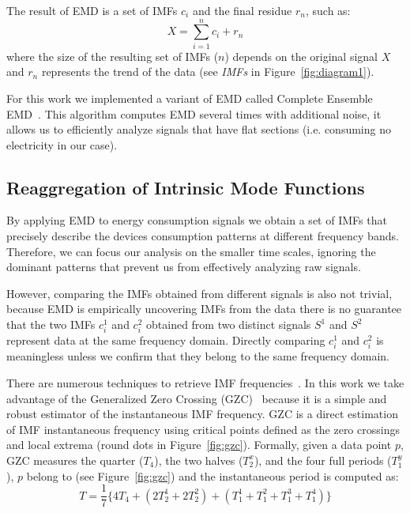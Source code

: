 The result of EMD is a set of IMFs $c_i$ and the final residue $r_n$, such as: \[X=\sum^{n}_{i=1}c_i+r_n\]
where the size of the resulting set of IMFs ($n$) depends on the original signal $X$ and $r_n$ represents the trend of 
the data (see \emph{IMFs} in Figure~\ref{fig:diagram1}).

For this work we implemented a variant of EMD called Complete Ensemble EMD~\cite{torres:icassp2012}.
This algorithm computes EMD several times with additional noise, it allows us to efficiently analyze signals that have 
flat sections (i.e. consuming no electricity in our case). %

\subsection{Reaggregation of Intrinsic Mode Functions} \label{methodo:corr}
By applying EMD to energy consumption signals we obtain a set of IMFs that precisely describe the devices consumption 
patterns at different frequency bands.  Therefore, we can focus our analysis on the smaller time scales, ignoring the dominant 
patterns that prevent us from effectively analyzing raw signals.

However, comparing the IMFs obtained from different signals is also not trivial,
 because EMD is empirically uncovering IMFs from the data there is no guarantee that the two IMFs $c_i^1$ and $c_i^2$ obtained from two distinct signals $S^1$ and $S^2$ represent data at the same frequency domain.
Directly comparing $c_i^1$ and $c_i^2$ is meaningless unless we confirm that they belong to the same frequency domain.

There are numerous techniques to retrieve IMF frequencies~\cite{IF}.  
In this work we take advantage of the Generalized Zero Crossing (GZC)~\cite{GZC} because it is a simple and robust 
estimator of the instantaneous IMF 
frequency\cite{IF}.
GZC is a direct estimation of IMF instantaneous frequency using critical points defined as the zero crossings and local extrema 
(round dots in Figure~\ref{fig:gzc}).
Formally, given a data point $p$, GZC measures the quarter ($T_4$), the two halves ($T_2^x$), and the four full periods ($T_1^y$), $p$   
belong to (see Figure~\ref{fig:gzc}) and the instantaneous period is computed as:
\[T=\frac{1}{7}\{4T_4+(2T_2^1+2T_2^2)+(T_1^1+T_1^2+T_1^3+T_1^4)\}\]

